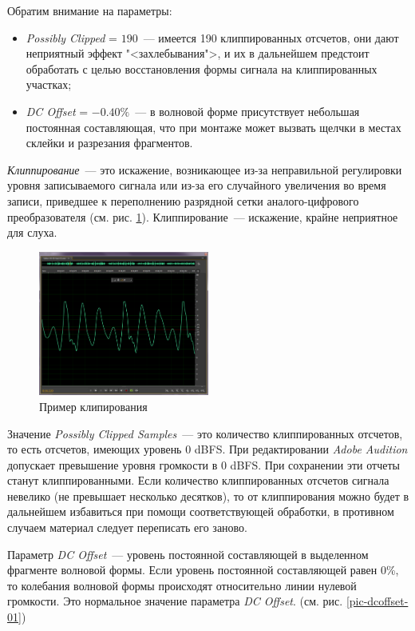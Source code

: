 \documentclass[oneside, final, 14pt]{extreport}
\begin{document}
Обратим внимание на параметры:
\begin{itemize}
\item \textit{Possibly Clipped} = $190$~--- имеется 190 клиппированных отсчетов, они дают неприятный эффект "<захлебывания">, и их в дальнейшем предстоит обработать с целью восстановления формы сигнала на клиппированных участках;
\item \textit{DC Offset} = $-0.40\%$~--- в волновой форме присутствует небольшая постоянная составляющая, что при монтаже может вызвать щелчки в местах склейки и разрезания фрагментов.
\end{itemize}

\textit{Клиппирование}~--- это искажение, возникающее из-за неправильной регулировки уровня записываемого сигнала или из-за его случайного увеличения во время записи, приведшее к переполнению разрядной сетки аналого-цифрового преобразователя (см. рис. \ref{pic-clipping-01}). Клиппирование~--- искажение, крайне неприятное для слуха.

\begin{figure}[h]
\centering
\includegraphics[width=0.5\textwidth]{pic-clipping-01}
\caption{Пример клипирования}
\label{pic-clipping-01}
\end{figure}

Значение \textit{Possibly Clipped Samples}~--- это количество клиппированных отсчетов, то есть отсчетов, имеющих уровень 0 dBFS. При редактировании \textit{Adobe Audition} допускает превышение уровня громкости в 0 dBFS. При сохранении эти отчеты станут клиппированными. Если количество клиппированных отсчетов сигнала невелико (не превышает несколько десятков), то от клиппирования можно будет в дальнейшем избавиться при помощи соответствующей обработки, в противном случаем материал следует переписать его заново. 

Параметр \textit{DC Offset}~--- уровень постоянной составляющей в выделенном фрагменте волновой формы. Если уровень постоянной составляющей равен 0\%, то колебания волновой формы происходят относительно линии нулевой громкости. Это нормальное значение параметра \textit{DC Offset}. (см. рис. \ref{pic-dcoffset-01})
\end{document}
